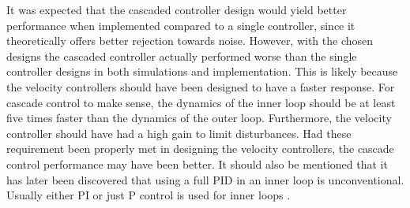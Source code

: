\documentclass[../../main.tex]{subfiles}
\begin{document}
It was expected that the cascaded controller design would yield better performance when implemented compared to a single controller, since it theoretically offers better rejection towards noise. However, with the chosen designs the cascaded controller actually performed worse than the single controller designs in both simulations and implementation. This is likely because the velocity controllers should have been designed to have a faster response. For cascade control to make sense, the dynamics of the inner loop should be at least five times faster than the dynamics of the outer loop. Furthermore, the velocity controller should have had a high gain to limit disturbances. Had these requirement been properly met in designing the velocity controllers, the cascade control performance may have been better. It should also be mentioned that it has later been discovered that using a full PID in an inner loop is unconventional. Usually either PI or just P control is used for inner loops \cite{CascadeControl}.
\end{document}

